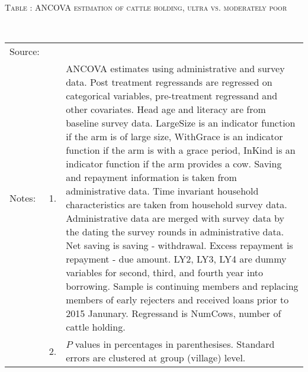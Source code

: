 \hspace{-1cm}\begin{minipage}[t]{14cm}
\hfil\textsc{\normalsize Table \thetable: ANCOVA estimation of cattle holding, ultra vs. moderately poor\label{tab ANCOVA NumCows poor}}\\
\setlength{\tabcolsep}{1pt}
\setlength{\baselineskip}{8pt}
\renewcommand{\arraystretch}{.55}
\hfil{}\\
\renewcommand{\arraystretch}{.8}
\setlength{\tabcolsep}{1pt}
\begin{tabular}{>{\hfill\scriptsize}p{1cm}<{}>{\hfill\scriptsize}p{.25cm}<{}>{\scriptsize}p{12cm}<{\hfill}}
Source:& \multicolumn{2}{l}{\scriptsize Estimated with GUK administrative and survey data.}\\
Notes: & 1. & ANCOVA estimates using administrative and survey data. Post treatment regressands are regressed on categorical variables, pre-treatment regressand and other covariates. Head age and literacy are from baseline survey data.  \textsf{LargeSize} is an indicator function if the arm is of large size, \textsf{WithGrace} is an indicator function if the arm is with a grace period, \textsf{InKind} is an indicator function if the arm provides a cow. Saving and repayment information is taken from administrative data. Time invariant household characteristics are taken from household survey data. Administrative data are merged with survey data by the dating the survey rounds in administrative data. Net saving is saving - withdrawal. Excess repayment is repayment - due amount. \textsf{LY2, LY3, LY4} are dummy variables for second, third, and 	fourth year into borrowing. Sample is continuing members and replacing members of early rejecters and received loans prior to 2015 Janunary. Regressand is \textsf{NumCows}, number of cattle holding. \\
& 2. & $P$ values in percentages in parenthesises. Standard errors are clustered at group (village) level.
\end{tabular}
\end{minipage}

